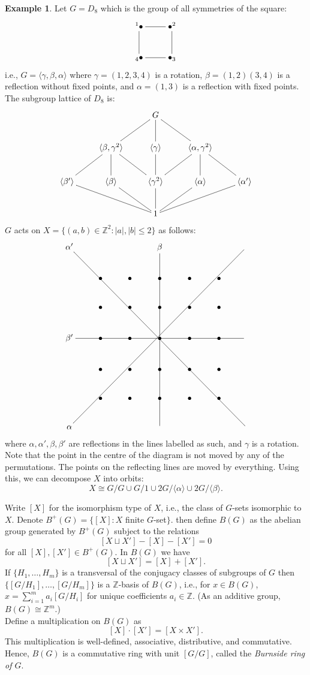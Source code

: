 \documentclass[12pt]{amsart}
\theoremstyle{definition}
\newtheorem{example}[theorem]{Example}
\begin{document}
\begin{example}
Let $G=D_8$ which is the group of all symmetries of the square:
$$\xymatrix{^1{\bullet} \ar@{-}[r] \ar@{-}[d] & {\bullet}^2 \\ _4{\bullet} & {\bullet}_3 \ar@{-}[l] \ar@{-}[u]}$$
i.e., $G=\langle\gamma,\beta,\alpha\rangle$ where $\gamma=(1,2,3,4)$ is a rotation, $\beta=(1,2)(3,4)$ is a reflection without fixed points, and $\alpha=(1,3)$ is a reflection with fixed points.  The subgroup lattice of $D_8$ is:
$$\xymatrix{&& G \ar@{-}[dl] \ar@{-}[d] \ar@{-}[dr]\\
& \langle\beta,\gamma^2\rangle \ar@{-}[dl] \ar@{-}[d] \ar@{-}[dr] & \langle\gamma\rangle \ar@{-}[d] & \langle\alpha,\gamma^2\rangle \ar@{-}[dl] \ar@{-}[d] \ar@{-}[dr] \\
\langle\beta'\rangle \ar@{-}[drr] & \langle\beta\rangle \ar@{-}[dr] & \langle\gamma^2\rangle \ar@{-}[d] & \langle\alpha\rangle \ar@{-}[dl] & \langle\alpha'\rangle \ar@{-}[dll] \\
&& 1}$$
$G$ acts on $X=\{(a,b)\in\mathbb{Z}^2:|a|,|b|\leq2\}$ as follows:
$$\xymatrix{ {\alpha'} \ar@{-}[ddddddrrrrrr] &&& {\beta}\ar@{-}[dddddd] &&& \\
& {\bullet} & {\bullet} & {\bullet} & {\bullet} & {\bullet} \\
& {\bullet} & {\bullet} & {\bullet} & {\bullet} & {\bullet} \\
{\beta'} \ar@{-}[rrrrrr] & {\bullet} & {\bullet} & {\bullet} & {\bullet} & {\bullet} & \\
& {\bullet} & {\bullet} & {\bullet} & {\bullet} & {\bullet} \\
& {\bullet} & {\bullet} & {\bullet} & {\bullet} & {\bullet} \\
{\alpha} \ar@{-}[uuuuuurrrrrr] &&&&&&}$$
where $\alpha, \alpha', \beta, \beta'$ are reflections in the lines labelled as such, and $\gamma$ is a rotation.  Note that the point in the centre of the diagram is not moved by any of the permutations.  The points on the reflecting lines are moved by everything.  Using this, we can decompose $X$ into orbits:
$$X\cong G/G\cup G/1\cup 2G/\langle\alpha\rangle\cup 2G/\langle\beta\rangle.$$
\end{example}

Write $[X]$ for the isomorphism type of $X$, i.e., the class of $G$-sets isomorphic to $X$.  Denote $B^+(G)=\{[X]:X$ finite $G$-set$\}$.  then define $B(G)$ as the abelian group generated by $B^+(G)$ subject to the relations
$$[X\sqcup X']-[X]-[X']=0$$
for all $[X], [X']\in B^+(G)$.  In $B(G)$ we have
$$[X\sqcup X']=[X]+[X'].$$
If $\{H_1,\ldots,H_m\}$ is a transversal of the conjugacy classes of subgroups of $G$ then $\{[G/H_1],\ldots,[G/H_m]\}$ is a $\mathbb{Z}$-basis of $B(G)$, i.e., for $x\in B(G)$, $x=\sum_{i=1}^m a_i[G/H_i]$ for unique coefficients $a_i\in\mathbb{Z}$.  (As an additive group, $B(G)\cong\mathbb{Z}^m$.)\\
Define a multiplication on $B(G)$ as
$$[X]\cdot [X']=[X\times X'].$$
This multiplication is well-defined, associative, distributive, and commutative.  Hence, $B(G)$ is a commutative ring with unit $[G/G]$, called the \emph{Burnside ring of $G$}.
\end{document}
